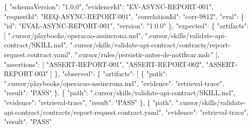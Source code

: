 \documentclass[
  10pt,
  a4paper,
  oneside]{book}
\newenvironment{Shaded}{}{}
\newcommand{\DataTypeTok}[1]{\textcolor[rgb]{0.56,0.13,0.00}{#1}}
\newcommand{\FunctionTok}[1]{\textcolor[rgb]{0.02,0.16,0.49}{#1}}
\newcommand{\OtherTok}[1]{\textcolor[rgb]{0.00,0.44,0.13}{#1}}
\newcommand{\StringTok}[1]{\textcolor[rgb]{0.25,0.44,0.63}{#1}}
\renewenvironment{Shaded}{\begin{snugshade}}{\end{snugshade}}%
\begin{document}
\begin{Shaded}
\begin{Highlighting}[]
\FunctionTok{\{}
  \DataTypeTok{"schemaVersion"}\FunctionTok{:} \StringTok{"1.0.0"}\FunctionTok{,}
  \DataTypeTok{"evidenceId"}\FunctionTok{:} \StringTok{"EV{-}ASYNC{-}REPORT{-}001"}\FunctionTok{,}
  \DataTypeTok{"requestId"}\FunctionTok{:} \StringTok{"REQ{-}ASYNC{-}REPORT{-}001"}\FunctionTok{,}
  \DataTypeTok{"correlationId"}\FunctionTok{:} \StringTok{"corr{-}9812"}\FunctionTok{,}
  \DataTypeTok{"eval"}\FunctionTok{:} \FunctionTok{\{}
    \DataTypeTok{"id"}\FunctionTok{:} \StringTok{"EVAL{-}ASYNC{-}REPORT{-}001"}\FunctionTok{,}
    \DataTypeTok{"version"}\FunctionTok{:} \StringTok{"1.0.0"}
  \FunctionTok{\},}
  \DataTypeTok{"expected"}\FunctionTok{:} \FunctionTok{\{}
    \DataTypeTok{"artifacts"}\FunctionTok{:} \OtherTok{[}
      \StringTok{".cursor/playbooks/operacao{-}assincrona.md"}\OtherTok{,}
      \StringTok{".cursor/skills/validate{-}api{-}contract/SKILL.md"}\OtherTok{,}
      \StringTok{".cursor/skills/validate{-}api{-}contract/contracts/report{-}request.contract.yaml"}\OtherTok{,}
      \StringTok{".cursor/rules/persistir{-}antes{-}de{-}notificar.mdc"}
    \OtherTok{]}\FunctionTok{,}
    \DataTypeTok{"assertions"}\FunctionTok{:} \OtherTok{[}
      \StringTok{"ASSERT{-}REPORT{-}001"}\OtherTok{,}
      \StringTok{"ASSERT{-}REPORT{-}002"}\OtherTok{,}
      \StringTok{"ASSERT{-}REPORT{-}003"}
    \OtherTok{]}
  \FunctionTok{\},}
  \DataTypeTok{"observed"}\FunctionTok{:} \FunctionTok{\{}
    \DataTypeTok{"artifacts"}\FunctionTok{:} \OtherTok{[}
      \FunctionTok{\{}
        \DataTypeTok{"path"}\FunctionTok{:} \StringTok{".cursor/playbooks/operacao{-}assincrona.md"}\FunctionTok{,}
        \DataTypeTok{"evidence"}\FunctionTok{:} \StringTok{"retrieval{-}trace"}\FunctionTok{,}
        \DataTypeTok{"result"}\FunctionTok{:} \StringTok{"PASS"}
      \FunctionTok{\}}\OtherTok{,}
      \FunctionTok{\{}
        \DataTypeTok{"path"}\FunctionTok{:} \StringTok{".cursor/skills/validate{-}api{-}contract/SKILL.md"}\FunctionTok{,}
        \DataTypeTok{"evidence"}\FunctionTok{:} \StringTok{"retrieval{-}trace"}\FunctionTok{,}
        \DataTypeTok{"result"}\FunctionTok{:} \StringTok{"PASS"}
      \FunctionTok{\}}\OtherTok{,}
      \FunctionTok{\{}
        \DataTypeTok{"path"}\FunctionTok{:} \StringTok{".cursor/skills/validate{-}api{-}contract/contracts/report{-}request.contract.yaml"}\FunctionTok{,}
        \DataTypeTok{"evidence"}\FunctionTok{:} \StringTok{"retrieval{-}trace"}\FunctionTok{,}
        \DataTypeTok{"result"}\FunctionTok{:} \StringTok{"PASS"}

\end{Highlighting}
\end{Shaded}
\end{document}
